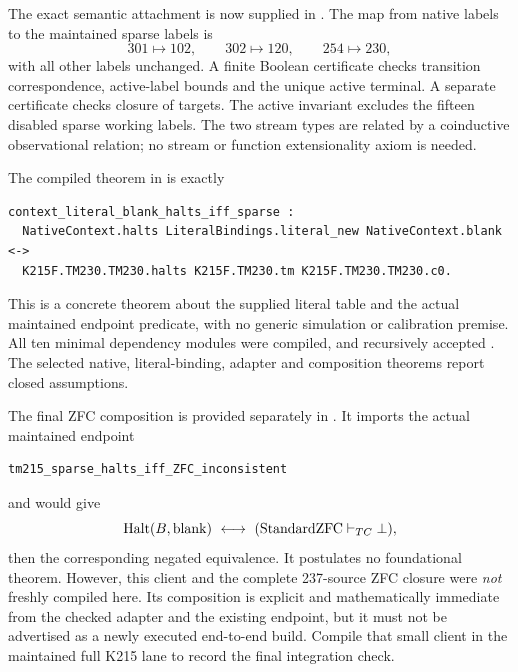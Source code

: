 The exact semantic attachment is now supplied in . The map from native labels to the maintained sparse labels is
\[
301\mapsto102,\qquad302\mapsto120,\qquad254\mapsto230,
\]
with all other labels unchanged. A finite Boolean certificate checks transition correspondence, active-label bounds and the unique active terminal. A separate certificate checks closure of targets. The active invariant excludes the fifteen disabled sparse working labels. The two stream types are related by a coinductive observational relation; no stream or function extensionality axiom is needed.

The compiled theorem in  is exactly
\begin{lstlisting}
context_literal_blank_halts_iff_sparse :
  NativeContext.halts LiteralBindings.literal_new NativeContext.blank <->
  K215F.TM230.TM230.halts K215F.TM230.tm K215F.TM230.TM230.c0.
\end{lstlisting}
This is a concrete theorem about the supplied literal table and the actual maintained endpoint predicate, with no generic simulation or calibration premise. All ten minimal dependency modules were compiled, and  recursively accepted . The selected native, literal-binding, adapter and composition theorems report closed assumptions.

The final ZFC composition is provided separately in . It imports the actual maintained  endpoint
\begin{lstlisting}
tm215_sparse_halts_iff_ZFC_inconsistent
\end{lstlisting}
and would give
\[
 \Halt(B,\mathrm{blank})\ \longleftrightarrow\ (\mathrm{StandardZFC}\vdash_{TC}\bot),
\]
then the corresponding negated equivalence. It postulates no foundational theorem. However, this client and the complete 237-source ZFC closure were \emph{not} freshly compiled here. Its composition is explicit and mathematically immediate from the checked adapter and the existing endpoint, but it must not be advertised as a newly executed end-to-end build. Compile that small client in the maintained full K215 lane to record the final integration check.
